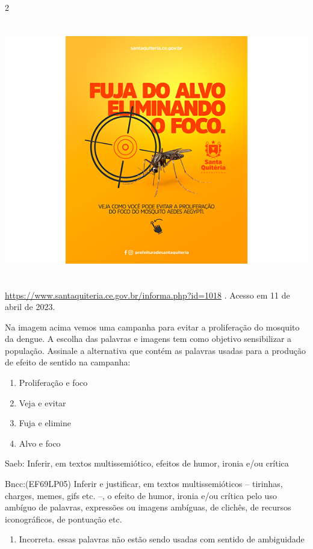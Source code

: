 {\num{2}

\includegraphics[width=5.90551in,height=4.43056in]{./imgSAEB_7_POR/media/image6.png}

\href{https://www.santaquiteria.ce.gov.br/informa.php?id=1018}{\uline{https://www.santaquiteria.ce.gov.br/informa.php?id=1018}}
. Acesso em 11 de abril de 2023.

Na imagem acima vemos uma campanha para evitar a proliferação do
mosquito da dengue. A escolha das palavras e imagens tem como objetivo
sensibilizar a população. Assinale a alternativa que contém as palavras
usadas para a produção de efeito de sentido na campanha:

\begin{enumerate}
\def\labelenumi{\alph{enumi})}
\item
  Proliferação e foco
\item
  Veja e evitar
\item
  Fuja e elimine
\item
  Alvo e foco
\end{enumerate}

Saeb: Inferir, em textos multissemiótico, efeitos de humor, ironia e/ou
crítica

Bncc:(EF69LP05) Inferir e justificar, em textos multissemióticos --
tirinhas, charges, memes, gifs etc. --, o efeito de humor, ironia e/ou
crítica pelo uso ambíguo de palavras, expressões ou imagens ambíguas, de
clichês, de recursos iconográficos, de pontuação etc.

\begin{enumerate}
\def\labelenumi{\arabic{enumi}.}
\tightlist
\item
  Incorreta. essas palavras não estão sendo usadas com sentido de
  ambiguidade
\end{enumerate}

}
